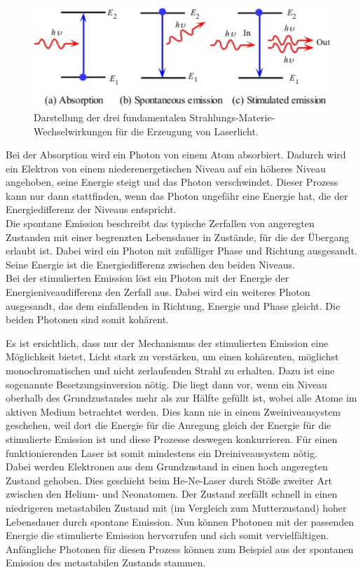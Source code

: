 \begin{figure}
  \centering
  \includegraphics[width=\textwidth]{data/mechanismenStrahlung.png}
  \caption{Darstellung der drei fundamentalen Strahlungs-Materie-Wechselwirkungen für die Erzeugung von Laserlicht.\cite{goingPostal}}
  \label{fig:mechanismenStrahlung}
\end{figure}

Bei der Absorption wird ein Photon von einem Atom absorbiert. Dadurch wird ein Elektron von einem niederenergetischen Niveau auf ein höheres Niveau angehoben, seine Energie steigt und das Photon verschwindet. Dieser Prozess kann nur dann stattfinden, wenn das Photon ungefähr eine Energie hat, die der Energiedifferenz der Niveaus entspricht.\\
Die spontane Emission beschreibt das typische Zerfallen von angeregten Zustanden mit einer begrenzten Lebensdauer in Zustände, für die der Übergang erlaubt ist. Dabei wird ein Photon mit zufälliger Phase und Richtung ausgesandt. Seine Energie ist die Energiedifferenz zwischen den beiden Niveaus.\\
Bei der stimulierten Emission löst ein Photon mit der Energie der Energieniveaudifferenz den Zerfall aus. Dabei wird ein weiteres Photon ausgesandt, das dem einfallenden in Richtung, Energie und Phase gleicht. Die beiden Photonen sind somit kohärent.

Es ist ersichtlich, dass nur der Mechanismus der stimulierten Emission eine Möglichkeit bietet, Licht stark zu verstärken, um einen kohärenten, möglichst monochromatischen und nicht zerlaufenden Strahl zu erhalten. Dazu ist eine sogenannte Besetzungsinversion nötig. Die liegt dann vor, wenn ein Niveau oberhalb des Grundzustandes mehr als zur Hälfte gefüllt ist, wobei alle Atome im aktiven Medium betrachtet werden. Dies kann nie in einem Zweiniveausystem geschehen, weil dort die Energie für die Anregung gleich der Energie für die stimulierte Emission ist und diese Prozesse deswegen konkurrieren. Für einen funktionierenden Laser ist somit mindestens ein Dreiniveausystem nötig.\\
Dabei werden Elektronen aus dem Grundzustand in einen hoch angeregten Zustand gehoben. Dies geschieht beim He-Ne-Laser durch Stöße zweiter Art zwischen den Helium- und Neonatomen. Der Zustand zerfällt schnell in einen niedrigeren metastabilen Zustand mit (im Vergleich zum Mutterzustand) hoher Lebensdauer durch spontane Emission. Nun können Photonen mit der passenden Energie die stimulierte Emission hervorrufen und sich somit vervielfältigen. Anfängliche Photonen für diesen Prozess können zum Beispiel aus der spontanen Emission des metastabilen Zustands stammen.

